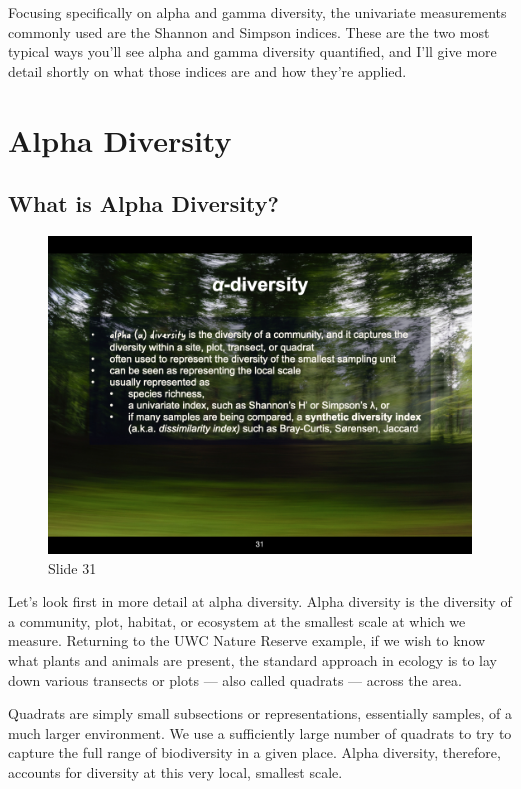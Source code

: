 \documentclass[
  10pt,
]{book}
\begin{document}
Focusing specifically on alpha and gamma diversity, the univariate
measurements commonly used are the Shannon and Simpson indices. These
are the two most typical ways you'll see alpha and gamma diversity
quantified, and I'll give more detail shortly on what those indices are
and how they're applied.

\section{Alpha Diversity}\label{alpha-diversity}

\subsection{What is Alpha Diversity?}\label{what-is-alpha-diversity}

\begin{figure}[ht]
\centering
\includegraphics[width=0.8\linewidth]{../images/BDC334/BDC334-031.jpeg}
\caption*{Slide 31}
\end{figure}

Let's look first in more detail at alpha diversity. Alpha diversity is
the diversity of a community, plot, habitat, or ecosystem at the
smallest scale at which we measure. Returning to the UWC Nature Reserve
example, if we wish to know what plants and animals are present, the
standard approach in ecology is to lay down various transects or plots
--- also called quadrats --- across the area.

Quadrats are simply small subsections or representations, essentially
samples, of a much larger environment. We use a sufficiently large
number of quadrats to try to capture the full range of biodiversity in a
given place. Alpha diversity, therefore, accounts for diversity at this
very local, smallest scale.
\end{document}
